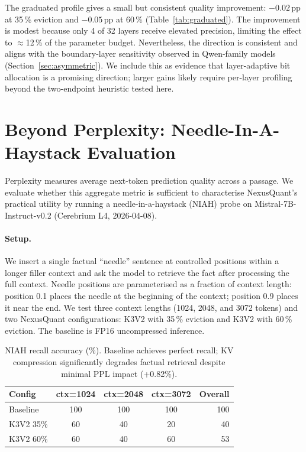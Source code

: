\documentclass{article}
\begin{document}
The graduated profile gives a small but consistent quality improvement:
$-0.02$\,pp at 35\,\% eviction and $-0.05$\,pp at 60\,\% (Table~\ref{tab:graduated}).
The improvement is modest because only 4 of 32 layers receive elevated precision,
limiting the effect to $\approx$12\,\% of the parameter budget. Nevertheless,
the direction is consistent and aligns with the boundary-layer sensitivity
observed in Qwen-family models (Section~\ref{sec:asymmetric}).
We include this as evidence that layer-adaptive bit allocation is a promising
direction; larger gains likely require per-layer profiling beyond the
two-endpoint heuristic tested here.

\section{Beyond Perplexity: Needle-In-A-Haystack Evaluation}
\label{sec:niah}

Perplexity measures average next-token prediction quality across a passage.
We evaluate whether this aggregate metric is sufficient to characterise
NexusQuant's practical utility by running a needle-in-a-haystack (NIAH) probe
on Mistral-7B-Instruct-v0.2 (Cerebrium L4, 2026-04-08).

\paragraph{Setup.}
We insert a single factual ``needle'' sentence at controlled positions within a
longer filler context and ask the model to retrieve the fact after processing the
full context.
Needle positions are parameterised as a fraction of context length:
position 0.1 places the needle at the beginning of the context;
position 0.9 places it near the end.
We test three context lengths (1024, 2048, and 3072 tokens) and two NexusQuant
configurations: K3V2 with 35\,\% eviction and K3V2 with 60\,\% eviction.
The baseline is FP16 uncompressed inference.

\begin{table}[h]
\centering
\caption{NIAH recall accuracy (\%). Baseline achieves perfect recall; KV compression significantly degrades factual retrieval despite minimal PPL impact (+0.82\%).}
\label{tab:niah}
\begin{tabular}{lcccr}
\toprule
Config & ctx=1024 & ctx=2048 & ctx=3072 & Overall \\
\midrule
Baseline & 100 & 100 & 100 & 100 \\
K3V2 35\% & 60 & 40 & 20 & 40 \\
K3V2 60\% & 60 & 40 & 60 & 53 \\
\bottomrule
\end{tabular}
\end{table}
\end{document}
